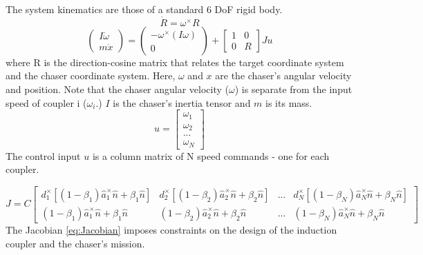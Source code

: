 The system kinematics are those of a standard 6 DoF rigid body. 
\begin{equation}\label{eq:rotMrxPropigation}
\dot{R} = \omega^{\times}R
\end{equation}
\begin{equation}\label{eq:RigidBodyKinematics}
\begin{pmatrix} 
I\dot{\omega} \\
m\ddot{x}
 \end{pmatrix}
=
\begin{pmatrix} 
-\omega^{ \times} \left( I\omega \right) \\
0
\end{pmatrix}
+
\begin{bmatrix}
1 & 0 \\
0 & R
\end{bmatrix}
Ju
\end{equation}
where R is the direction-cosine matrix that relates the target coordinate system and the chaser coordinate system. Here, $\omega$ and $x$ are the chaser's angular velocity and position. Note that the chaser angular velocity ($\omega$) is separate from the input speed of coupler i ($\omega_i$.)  $I$ is the chaser's inertia tensor and $m$ is its mass.
\begin{equation}
\label{eq:u_definition}
u = 
\begin{bmatrix}
\omega_1\\
\omega_2\\
...\\
\omega_N
\end{bmatrix}
\end{equation}
The control input $u$ is a column matrix of N speed commands - one for each coupler.

\begin{equation}\label{eq:Jacobian}
J = C\begin{bmatrix} 
d_1^{\times}\left[ \left(1-\beta_1 \right )\hat{a}_1^{\times}\hat{n} + \beta_1\hat{n}\right ]&
d_2^{\times}\left[\left(1-\beta_2 \right )\hat{a}_2^{\times}\hat{n} + \beta_2\hat{n}\right ] &
 ... &
d_N^{\times} \left[\left(1-\beta_N \right )\hat{a}_N^{\times}\hat{n} + \beta_N\hat{n}\right ]
\\

\left(1-\beta_1 \right )\hat{a}_1^{\times}\hat{n} + \beta_1\hat{n}&
\left(1-\beta_2 \right )\hat{a}_2^{\times}\hat{n} + \beta_2\hat{n} &
 ... &
 \left(1-\beta_N \right )\hat{a}_N^{\times}\hat{n} + \beta_N\hat{n}
\end{bmatrix}
\end{equation}
The Jacobian \ref{eq:Jacobian}  imposes constraints on the design of the induction coupler and the chaser's mission.


